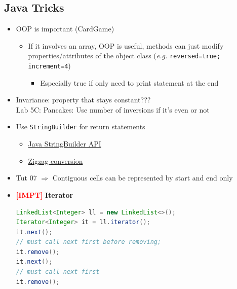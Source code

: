 \documentclass{article}
\newcommand{\eg}[0]{\textit{e.g. }}
\newcommand{\impt}[0]{\textcolor{red}{\textbf{[IMPT] }}}
\begin{document}
\begin{multicols}{2}
\section{Java Tricks}
\begin{itemize}
	\item OOP is important (CardGame)
	\begin{itemize}
		\item If it involves an array, OOP is useful, methods can just modify properties/attributes of the object class (\eg \texttt{reversed=true; increment=4})
		\begin{itemize}
			\item Especially true if only need to print statement at the end
		\end{itemize}
	\end{itemize}
	\item Invariance: property that stays constant???\\
	Lab 5C: Pancakes: Use number of inversions if it's even or not
	\item Use \texttt{StringBuilder} for return statements
	\begin{itemize}
		\item \href{https://docs.oracle.com/javase/7/docs/api/java/lang/StringBuilder.html}{Java StringBuilder API}
		\item \href{https://leetcode.com/problems/zigzag-conversion/solution/}{Zigzag conversion}
	\end{itemize}
    \item Tut 07 $\Rightarrow$ Contiguous cells can be represented by start and end only
    \item \impt \textbf{Iterator}
    \begin{lstlisting}[language=Java]
LinkedList<Integer> ll = new LinkedList<>();
Iterator<Integer> it = ll.iterator();
it.next();
// must call next first before removing;
it.remove();
it.next();
// must call next first
it.remove();
\end{lstlisting}

\end{itemize}

\end{multicols}
\end{document}

